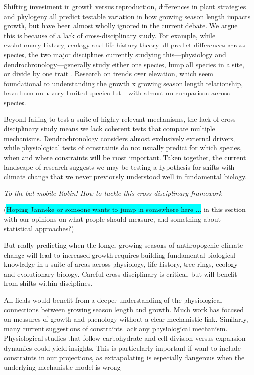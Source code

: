 \documentclass[11pt]{article}
\begin{document}
Shifting investment in growth versus reproduction, differences in plant strategies and phylogeny all predict testable variation in how growing season length impacts growth, but have been almost wholly ignored in the current debate. We argue this is because of a lack of cross-disciplinary study. For example, while evolutionary history, ecology and life history theory all predict differences across species, the two major disciplines currently studying this---physiology and dendrochronology---generally study either one species, lump all species in a site, or divide by one trait \citep[e.g.,][]{dow2022warm}. Research on trends over elevation, which seem foundational to understanding the growth x growing season length relationship, have been on a very limited species list---with almost no comparison across species. %

Beyond failing to test a suite of highly relevant mechanisms, the lack of cross-disciplinary study means we lack coherent tests that compare multiple mechanisms. Dendrochronology considers almost exclusively external drivers, while physiological tests of constraints do not usually predict for which species, when and where constraints will be most important. Taken together, the current landscape of research suggests we may be testing a hypothesis for shifts with climate change that we never previously understood well in fundamental biology. 

\emph{To the bat-mobile Robin! How to tackle this cross-disciplinary framework}

(\colorbox{cyan}{Hoping Janneke or someone wants to jump in somewhere here ...} in this section with our opinions on what people should measure, and something about statistical approaches?)

But really predicting when the longer growing seasons of anthropogenic climate change will lead to increased growth requires building fundamental biological knowledge in a suite of areas across physiology, life history, tree rings, ecology and evolutionary biology. Careful cross-disciplinary is critical, but will benefit from shifts within disciplines. 

All fields would benefit from a deeper understanding of the physiological connections between growing season length and growth. Much work has focused on measures of growth and phenology without a clear mechanistic link. Similarly, many current suggestions of constraints lack any physiological mechanism. Physiological studies that follow carbohydrate and cell division versus expansion dynamics could yield insights. This is particularly important if want to include constraints in our projections, as extrapolating is especially dangerous when the underlying mechanistic model is wrong
\end{document}
